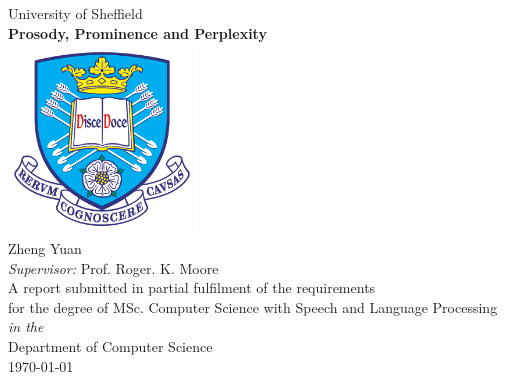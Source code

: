 \documentclass[11pt,oneside]{book}
\begin{document}

\frontmatter

\begin{titlepage}



\begin{center}
{\LARGE University of Sheffield}\\[1.5cm]
\linespread{1.2}\huge {\bfseries Prosody, Prominence and Perplexity}\\[1.5cm]
\includegraphics[width=5cm]{images/tuoslogo.png}\\[1cm]
{\Large Zheng Yuan}\\[0.5cm]
{\large \emph{Supervisor:} Prof. Roger. K. Moore}\\[0.5cm] %
\large A report submitted in partial fulfilment of the requirements\\ for the degree of MSc. Computer Science with Speech and Language Processing\\[0.3cm] 
\textit{in the}\\[0.3cm]
Department of Computer Science\\[2cm]
\today
\end{center}

\end{titlepage}


%
\end{document}
